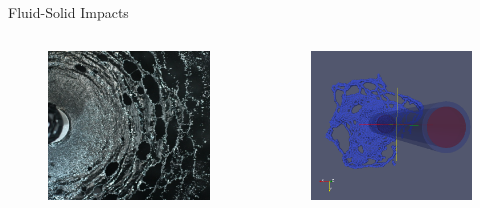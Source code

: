 \begin{frame}{\thesec}{Fluid-Solid Impacts}
  \vspace*{-2.1\baselineskip}
  \begin{columns}
    \begin{column}{0.5\textwidth}
      \begin{figure}
        \centering
        \includegraphics[width=\textwidth]{img/flappingSheetBreakup2_sm.png}
      \end{figure}
    \end{column}
    \begin{column}{0.5\textwidth}
      \begin{figure}
        \centering
        \includegraphics[width=\textwidth]{img/ren_marshall_far.png}
      \end{figure}
    \end{column}
  \end{columns}
\end{frame}
